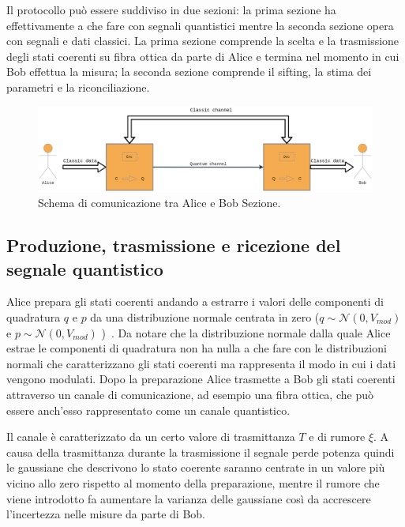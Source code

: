 Il protocollo pu\`o essere suddiviso in due sezioni: la prima sezione ha effettivamente a che fare con segnali quantistici mentre la seconda sezione opera con segnali e dati classici. La prima sezione comprende la scelta e la trasmissione degli stati coerenti su fibra ottica da parte di Alice e termina nel momento in cui Bob effettua la misura; la seconda sezione comprende il sifting, la stima dei parametri e la riconciliazione.

\begin{figure}[H] 
\begin{center}
\includegraphics[width=\textwidth]{figure/alice_bob_communication.eps} 
\end{center}
\caption{Schema di comunicazione tra Alice e Bob Sezione.} \label{fig:alice-bob-schema}
\end{figure}

\subsection{Produzione, trasmissione e ricezione del segnale quantistico}\label{subse:sottosezione2-1-1}
Alice prepara gli stati coerenti andando a estrarre i valori delle componenti di quadratura $q$ e $p$ da una distribuzione normale centrata in zero ($q \sim {\mathcal N(0, V_{mod})}$ e $p \sim {\mathcal N(0, V_{mod})}$ )~\cite{https://doi.org/10.1002/qute.201800011}. Da notare che la distribuzione normale dalla quale Alice estrae le componenti di quadratura non ha nulla a che fare con le distribuzioni normali che caratterizzano gli stati coerenti ma rappresenta il modo in cui i dati vengono modulati. Dopo la preparazione Alice trasmette a Bob gli stati coerenti attraverso un canale di comunicazione, ad esempio una fibra ottica, che può essere anch'esso rappresentato come un canale quantistico.

Il canale \`e caratterizzato da un certo valore di trasmittanza $T$ e di rumore $\xi$. A causa della trasmittanza durante la trasmissione il segnale perde potenza quindi le gaussiane che descrivono lo stato coerente saranno centrate in un valore pi\`u vicino allo zero rispetto al momento della preparazione, mentre il rumore che viene introdotto fa aumentare la varianza delle gaussiane cos\`i da accrescere l'incertezza nelle misure da parte di Bob.

